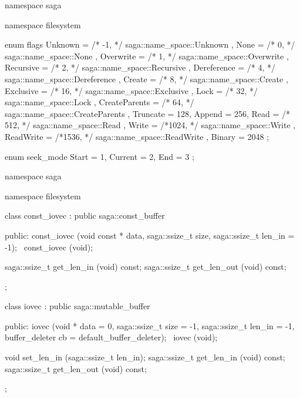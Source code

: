   \begin{mycode}[label=saga::filesystem enums]
  namespace saga
  {
    namespace filesystem 
    {
      enum flags 
      {
        Unknown         = /*  -1, */  saga::name_space::Unknown       ,
        None            = /*   0, */  saga::name_space::None          ,
        Overwrite       = /*   1, */  saga::name_space::Overwrite     ,
        Recursive       = /*   2, */  saga::name_space::Recursive     ,
        Dereference     = /*   4, */  saga::name_space::Dereference   ,
        Create          = /*   8, */  saga::name_space::Create        ,
        Exclusive       = /*  16, */  saga::name_space::Exclusive     ,
        Lock            = /*  32, */  saga::name_space::Lock          ,
        CreateParents   = /*  64, */  saga::name_space::CreateParents ,
        Truncate        =    128, 
        Append          =    256,
        Read            = /* 512, */  saga::name_space::Read          ,
        Write           = /*1024, */  saga::name_space::Write         ,
        ReadWrite       = /*1536, */  saga::name_space::ReadWrite     ,
        Binary          =   2048 
      };       

      enum seek_mode
      {
        Start   = 1,
        Current = 2,
        End     = 3
      }; 
    }
  }
  \end{mycode}
    
  \begin{mycode}[label=Prototype: saga::filesystem::iovec]
  namespace saga
  {
    namespace filesystem 
    {
      class const_iovec 
          : public saga::const_buffer
      {
        public:
          const_iovec (void const  * data, 
                       saga::ssize_t size, 
                       saga::ssize_t len_in = -1);
         ~const_iovec (void);
  
          saga::ssize_t get_len_in  (void) const;
          saga::ssize_t get_len_out (void) const;
  
      };
  
      class iovec 
          : public saga::mutable_buffer
      {
        public:
          iovec (void *         data   = 0, 
                 saga::ssize_t  size   = -1, 
                 saga::ssize_t  len_in = -1, 
                 buffer_deleter cb     = default_buffer_deleter);
         ~iovec (void);
  
          void          set_len_in  (saga::ssize_t len_in);
          saga::ssize_t get_len_in  (void) const;
          saga::ssize_t get_len_out (void) const;
      };
    }
  }
  \end{mycode}

